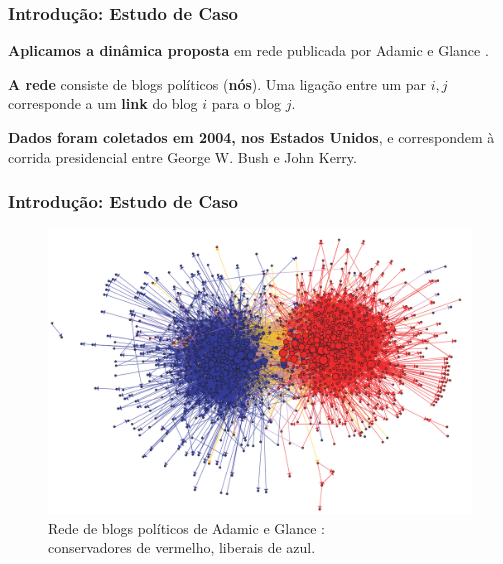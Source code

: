 \begin{frame}
  \frametitle{Introdução: Estudo de Caso}

  \begin{alertblock}{}
    \vspace{5mm}

    \textbf{\alert{Aplicamos a dinâmica proposta}} em rede publicada por Adamic e Glance
      \cite{Adamic:2005:PoliticalBlogs}.
    \vspace{5mm}

    \textbf{\alert{A rede}} consiste de blogs políticos (\textbf{nós}). Uma
      ligação entre um par $i, j$ corresponde a um \textbf{link} do blog $i$ para
      o blog $j$.
    \vspace{5mm}

    \textbf{\alert{Dados foram coletados em 2004, nos Estados Unidos}}, e
      correspondem à corrida presidencial entre George W. Bush e John Kerry.
    \vspace{5mm}

  \end{alertblock}
\end{frame}

\begin{frame}
  \frametitle{Introdução: Estudo de Caso}

  \begin{figure}
    \centering
    \includegraphics[scale=0.2125]{./figures/AdamicGlanceNetwork}
    \caption*{Rede de blogs políticos de Adamic e Glance
      \cite{Adamic:2005:PoliticalBlogs}: \\ conservadores de vermelho, liberais
      de azul.}
  \end{figure}
\end{frame}

